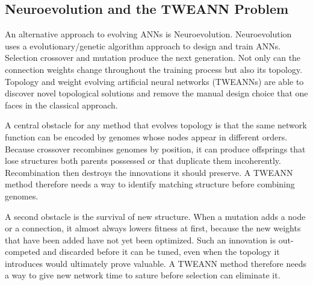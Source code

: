 \documentclass[12pt]{article}
\begin{document}
\subsection{Neuroevolution and the TWEANN Problem}


An alternative approach to evolving ANNs is Neuroevolution. Neuroevolution uses a evolutionary/genetic algorithm approach to design and train ANNs. Selection crossover and mutation produce the next generation. Not only can the connection weights change throughout the training process but also its topology. Topology and weight evolving artificial neural networks (TWEANNs) are able to discover novel topological solutions and remove the manual design choice that one faces in the classical approach.

A central obstacle for any method that evolves topology is that the same network function can be encoded by genomes whose nodes appear in different orders. Because crossover recombines genomes by position, it can produce offsprings that lose structures both parents possessed or that duplicate them incoherently. Recombination then destroys the innovations it should preserve. A TWEANN method therefore needs a way to identify matching structure before combining genomes.

A second obstacle is the survival of new structure. When a mutation adds a node or a connection, it almost always lowers fitness at first, because the new weights that have been added have not yet been optimized. Such an innovation is out-competed and discarded before it can be tuned, even when the topology it introduces would ultimately prove valuable. A TWEANN method therefore needs a way to give new network time to sature before selection can eliminate it.
\end{document}
